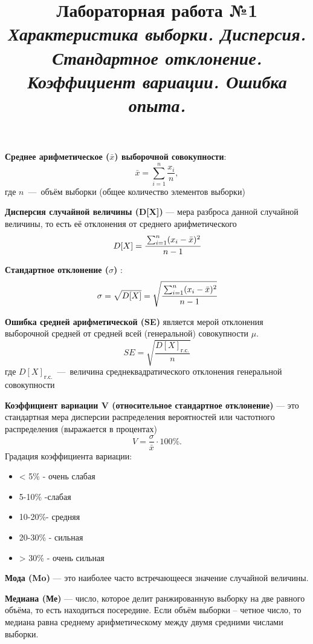 \documentclass[14pt,a4paper]{article}
\title{Лабораторная работа №1 \\ \textit{Характеристика выборки. Дисперсия. Стандартное отклонение. Коэффициент вариации. Ошибка опыта.}}
\begin{document}
\maketitle
\textbf{Среднее арифметическое ($\bar{x}$) выборочной совокупности}:
\begin{equation}
    \bar{x} = \sum\limits^n_{i=1}\frac{x_i}{n},
\end{equation}
где $n$~---~объём выборки (общее количество элементов выборки)

\textbf{Дисперсия случайной величины (D[X])} — мера разброса данной случайной величины, то есть её отклонения от среднего арифметического
\begin{equation}
    D[X] =\cfrac{\sum_{i=1}^n(x_i-\bar{x})^2}{n-1}
\end{equation}

\textbf{Стандартное отклонение ($\sigma$)} :
\begin{equation}
    \sigma = \sqrt{D[X]}  = \sqrt{\cfrac{\sum_{i=1}^n(x_i-\bar{x})^2}{n-1}}
\end{equation}

\textbf{Ошибка средней арифметической (SE)} является мерой отклонения выборочной средней от средней всей (генеральной) совокупности $\mu$.
\begin{equation}
    SE = \sqrt{\frac{D[X]_\text{г.с.}}{n}}
\end{equation}
где $D[X]_\text{г.с.}$~---~величина среднеквадратического отклонения генеральной совокупности

\textbf{Коэффициент вариации V (относительное стандартное отклонение)} — это стандартная мера дисперсии распределения вероятностей или частотного распределения (выражается в процентах)
\begin{equation}
    V = \frac{\sigma}{\bar{x}}\cdot 100\%.
\end{equation}
Градация коэффициента вариации:
\begin{itemize}
    \item < 5\% - очень слабая
    \item 5-10\% -слабая
    \item 10-20\%- средняя
    \item 20-30\% - сильная
    \item > 30\% - очень сильная
\end{itemize}

\textbf{Мода (Mo)} — это наиболее часто встречающееся значение случайной величины.

\textbf{Медиана (Ме)} — число, которое делит ранжированную выборку на две равного объёма, то есть находиться посередине. Если объём выборки – четное число, то медиана равна среднему арифметическому между двумя средними числами выборки.
\end{document}
